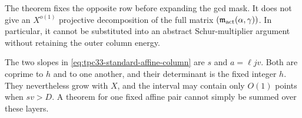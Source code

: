 \begin{remark}
The theorem fixes the opposite row before expanding the gcd mask.  It does
not give an \(X^{o(1)}\) projective decomposition of the full matrix
\((\mathfrak m_{\rm act}(\alpha,\gamma))\).  In particular, it cannot be
substituted into an abstract Schur-multiplier argument without retaining
the outer column energy.
\end{remark}

\begin{remark}
The two slopes in \eqref{eq:tpc33-standard-affine-column} are
\(s\) and \(a=\ell jv\).  Both are coprime to \(h\) and to one another,
and their determinant is the fixed integer \(h\).  They nevertheless grow
with \(X\), and the interval may contain only \(O(1)\) points when
\(sv>D\).  A theorem for one fixed affine pair cannot simply be summed over
these layers.
\end{remark}

